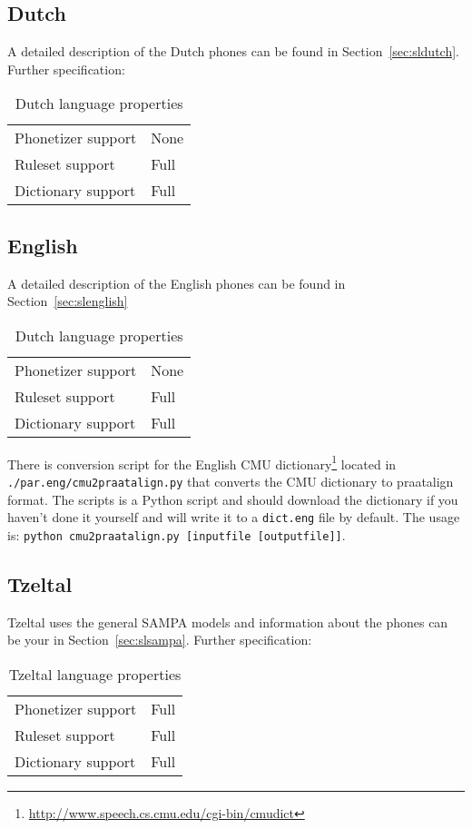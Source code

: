 \subsection{Dutch}
A detailed description of the Dutch phones can be found in
Section~\ref{sec:sldutch}. Further specification:
\begin{table}[H]
	\caption{Dutch language properties}
	\begin{tabular}{ll}
		Phonetizer support & None\\
		Ruleset support & Full\\
		Dictionary support & Full
	\end{tabular}
\end{table}

\subsection{English}
A detailed description of the English phones can be found in
Section~\ref{sec:slenglish}
\begin{table}[H]
	\caption{Dutch language properties}
	\begin{tabular}{ll}
		Phonetizer support & None\\
		Ruleset support & Full\\
		Dictionary support & Full
	\end{tabular}
\end{table}
There is conversion script for the English CMU
dictionary\footnote{\url{http://www.speech.cs.cmu.edu/cgi-bin/cmudict}} located
in \texttt{./par.eng/cmu2praatalign.py} that converts the CMU dictionary to
praatalign format. The scripts is a Python script and should download the
dictionary if you haven't done it yourself and will write it to a
\texttt{dict.eng} file by default. The usage is: \texttt{python
cmu2praatalign.py [inputfile [outputfile]]}.

\subsection{Tzeltal}
Tzeltal uses the general SAMPA models and information about the phones can be
your in Section~\ref{sec:slsampa}. Further specification:
\begin{table}[H]
	\caption{Tzeltal language properties}
	\begin{tabular}{ll}
		Phonetizer support & Full\\
		Ruleset support & Full\\
		Dictionary support & Full
	\end{tabular}
\end{table}

